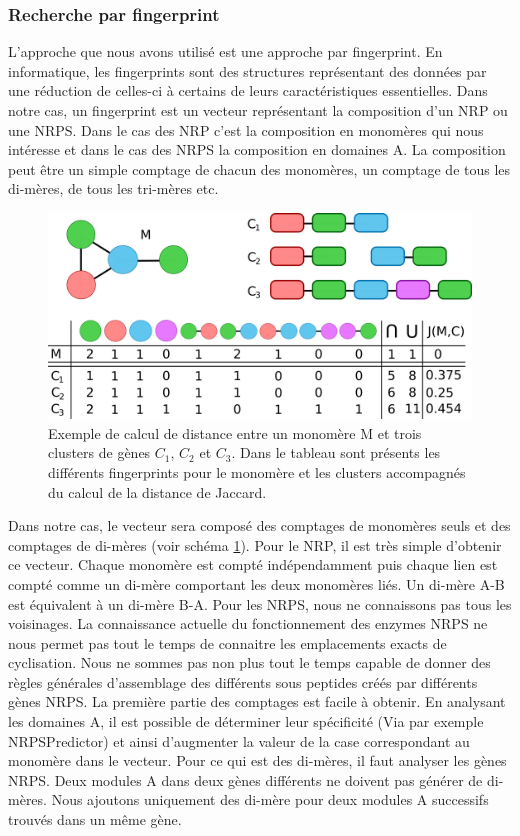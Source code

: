 \subsubsection{Recherche par fingerprint}

L'approche que nous avons utilisé est une approche par fingerprint.
En informatique, les fingerprints sont des structures représentant des données par une réduction de celles-ci à certains de leurs caractéristiques essentielles.
Dans notre cas, un fingerprint est un vecteur représentant la composition d'un NRP ou une NRPS.
Dans le cas des NRP c'est la composition en monomères qui nous intéresse et dans le cas des NRPS la composition en domaines A.
La composition peut être un simple comptage de chacun des monomères, un comptage de tous les di-mères, de tous les tri-mères etc.

\begin{figure}[h!]
  \begin{center}
    \includegraphics[width=450px]{Figures/synthese/fingerprints.png}
    \caption{\label{jaccard}Exemple de calcul de distance entre un monomère M et trois clusters de gènes $C_1$, $C_2$ et $C_3$.
    Dans le tableau sont présents les différents fingerprints pour le monomère et les clusters accompagnés du calcul de la distance de Jaccard.}
  \end{center}
\end{figure}

Dans notre cas, le vecteur sera composé des comptages de monomères seuls et des comptages de di-mères (voir schéma \ref{jaccard}).
Pour le NRP, il est très simple d'obtenir ce vecteur.
Chaque monomère est compté indépendamment puis chaque lien est compté comme un di-mère comportant les deux monomères liés.
Un di-mère A-B est équivalent à un di-mère B-A.
Pour les NRPS, nous ne connaissons pas tous les voisinages.
La connaissance actuelle du fonctionnement des enzymes NRPS ne nous permet pas tout le temps de connaitre les emplacements exacts de cyclisation.
Nous ne sommes pas non plus tout le temps capable de donner des règles générales d'assemblage des différents sous peptides créés par différents gènes NRPS.
La première partie des comptages est facile à obtenir.
En analysant les domaines A, il est possible de déterminer leur spécificité (Via par exemple NRPSPredictor) et ainsi d'augmenter la valeur de la case correspondant au monomère dans le vecteur.
Pour ce qui est des di-mères, il faut analyser les gènes NRPS.
Deux modules A dans deux gènes différents ne doivent pas générer de di-mères.
Nous ajoutons uniquement des di-mère pour deux modules A successifs trouvés dans un même gène.

